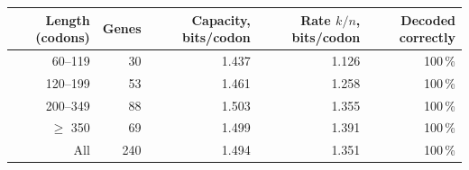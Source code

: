 \begin{tabular}{@{}r r r r r@{}}
\toprule
Length (codons) & Genes & Capacity, bits/codon & Rate $k/n$, bits/codon & Decoded correctly \\
\midrule
60--119 & 30 & 1.437 & 1.126 & 100\,\% \\
120--199 & 53 & 1.461 & 1.258 & 100\,\% \\
200--349 & 88 & 1.503 & 1.355 & 100\,\% \\
$\geq$ 350 & 69 & 1.499 & 1.391 & 100\,\% \\
\midrule
All & 240 & 1.494 & 1.351 & 100\,\% \\
\bottomrule
\end{tabular}